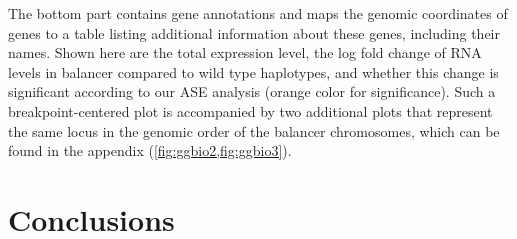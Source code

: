 The bottom part contains  gene annotations and maps the
genomic coordinates of genes to a table listing additional information about
these genes, including their names. Shown here are the  total
expression level, the  log fold change of RNA levels in balancer
compared to wild type haplotypes, and whether this change is significant
according to our ASE analysis (orange color for significance).
Such a breakpoint-centered plot is accompanied by two additional
plots that represent the same locus in the genomic order of the balancer
chromosomes, which can be found in the appendix (\cref{fig:ggbio2,fig:ggbio3}).







\section{Conclusions}
\label{sec:balancer_concl}
